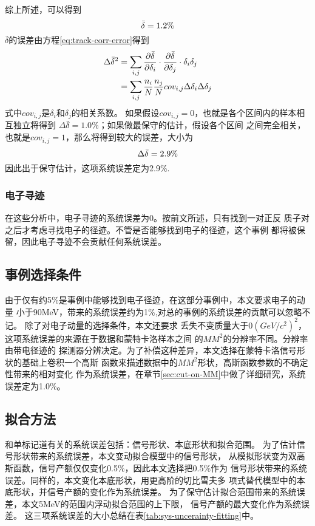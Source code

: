 综上所述，可以得到 
\begin{equation}
    \bar{\delta} = 1.2 \% \notag
\end{equation}
$\bar{\delta}$的误差由方程\ref{eq:track-corr-error}得到
\begin{equation}
    \begin{aligned}
        \label{eq:track-corr-error}
        \Delta \bar{\delta }^{2} & = 
        \sum_{i,j} 
        \frac{\partial \bar{\delta }} {\partial \delta_{i}} \cdot 
        \frac{\partial \bar{\delta }} {\partial \delta_{j}} \cdot 
        \delta_{i} \delta_{j}  
        \notag \\
        &= \sum_{i,j}  \frac{n_{i}}{N} \frac{n_{j}}{N}
        cov_{i,j}   \Delta  \delta_{i} \Delta  \delta_{j} 
    \end{aligned}
\end{equation}
式中$cov_{i,j}$是$\delta_{i}$和$\delta_{j}$的相关系数。
如果假设$cov_{i,j}=0$，也就是各个区间内的样本相互独立将得到
$ \Delta \bar{\delta } = 1.0\%$；如果做最保守的估计，假设各个区间
之间完全相关，也就是$cov_{i,j}=1$，那么将得到较大的误差，大小为 
\begin{equation}
    \Delta \bar{\delta} = 2.9\% \notag
\end{equation}
因此出于保守估计，这项系统误差定为2.9\%.

\subsubsection{电子寻迹}
在这些分析中，电子寻迹的系统误差为0。按前文所述，只有找到一对正反
质子对之后才考虑寻找电子的径迹。不管是否能够找到电子的径迹，这个事例
都将被保留，因此电子寻迹不会贡献任何系统误差。

\subsection{事例选择条件}
由于仅有约5\%是事例中能够找到电子径迹，在这部分事例中，本文要求电子的动量
小于90MeV，带来的系统误差约为1\%,对总的事例的系统误差的贡献可以忽略不记。
除了对电子动量的选择条件，本文还要求
丢失不变质量大于0${(GeV/c^{2})}^{2}$，这项系统误差的来源在于数据和蒙特卡洛样本之间
的$MM^{2}$的分辨率不同。分辨率由带电径迹的
探测器分辨决定。为了补偿这种差异，本文选择在蒙特卡洛信号形状的基础上卷积一个高斯
函数来描述数据中的$MM^{2}$形状，高斯函数参数的不确定性带来的相对变化
作为系统误差，在章节\ref{sec:cut-on-MM}中做了详细研究，系统误差定为1.0\%。

\subsection{拟合方法}
和单标记道有关的系统误差包括：信号形状、本底形状和拟合范围。
为了估计信号形状带来的系统误差，本文变动拟合模型中的信号形状，
从模拟形状变为双高斯函数，信号产额仅仅变化0.5\%，因此本文选择把0.5\%作为
信号形状带来的系统误差。同样的，本文变化本底形状，用更高阶的切比雪夫多
项式替代模型中的本底形状，并信号产额的变化作为系统误差。
为了保守估计拟合范围带来的系统误差，本文5MeV的范围内浮动拟合范围的上下限，
信号产额的最大变化作为系统误差。
这三项系统误差的大小总结在表\ref{tab:sys-uncerainty-fitting}中。


